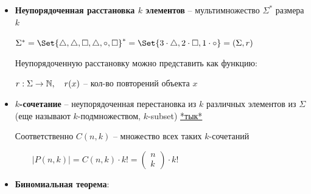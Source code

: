 \documentclass[12pt]{article}
\begin{document}
\begin{itemize}
\begin{minipage}{\linewidth}
\begin{figure}
            \end{figure}


            $\pi_1, \pi_2 \in P(n, k)$ -- циклически эквивалентны тогда и только тогда:


            $P_C(n, k)$ -- множество всех циклических $k$-перестановок в $\Sigma$

            $|P_C(n, k)| \cdot k = |P(n, k)|$


        \end{minipage}


        \item \textbf{Неупорядоченная расстановка $k$ элементов} -- мультимножество $\Sigma^*$ размера $k$

        \Exs $\Sigma^* = \Set{\triangle, \triangle, \Box, \triangle, \circ, \Box}^* = \Set{3 \cdot \triangle, 2 \cdot \Box, 1 \cdot \circ} = (\Sigma, r)$

        Неупорядоченную расстановку можно представить как функцию:

        $r : \Sigma \to \mathbb{N}, \quad r(x)$ -- кол-во повторений объекта $x$


        \item \textbf{$k$-сочетание} -- неупорядоченная перестановка из $k$ различных элементов из $\Sigma$ (еще называют $k$-подмножеством, $k$-subset)
        \hfill\href{https://ru.wikipedia.org/wiki/%D0%A1%D0%BE%D1%87%D0%B5%D1%82%D0%B0%D0%BD%D0%B8%D0%B5}{*тык*}

        Соответственно $C(n, k)$ -- множество всех таких $k$-сочетаний

        $\quad\quad |P(n, k)| = C(n, k) \cdot k! = \begin{pmatrix}n \\ k\end{pmatrix} \cdot k!$

        \item \Ths \textbf{Биномиальная теорема}:


\end{itemize}
\end{document}
